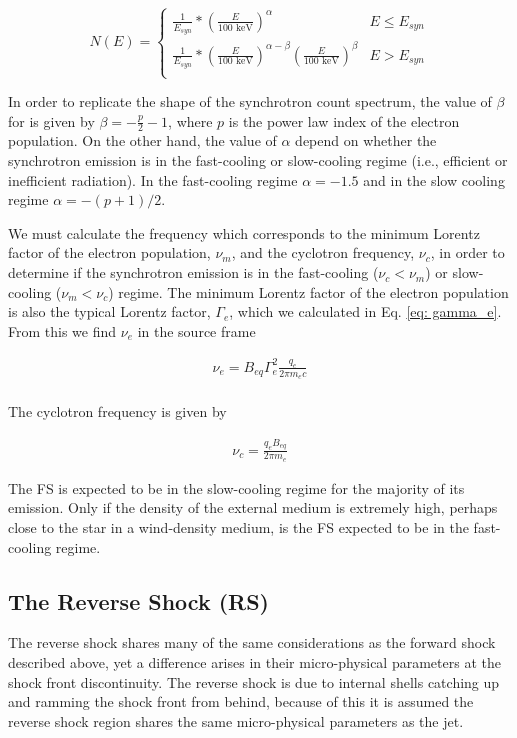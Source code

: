 \documentclass[linenumbers,twocolumn]{aastex631}
\begin{document}
\[ N(E) =
	\begin{cases}
		\frac{1}{E_{syn}}*\left(\frac{E}{100 \text{ keV}}\right)^\alpha & E\leq E_{syn} \\
		\frac{1}{E_{syn}}*\left(\frac{E}{100 \text{ keV}}\right)^{\alpha-\beta}\left(\frac{E}{100\text{ keV}}\right)^\beta & E > E_{syn} \\
	\end{cases}
\]

In order to replicate the shape of the synchrotron count spectrum, the value of $\beta$ for is given by $\beta = -\frac{p}{2} - 1$, where $p$ is the power law index of the electron population. On the other hand, the value of $\alpha$ depend on whether the synchrotron emission is in the fast-cooling or slow-cooling regime (i.e., efficient or inefficient radiation). In the fast-cooling regime $\alpha=-1.5$ and in the slow cooling regime $\alpha=-(p+1)/2$.

We must calculate the frequency which corresponds to the minimum Lorentz factor of the electron population, $\nu_m$, and the cyclotron frequency, $\nu_c$, in order to determine if the synchrotron emission is in the fast-cooling ($\nu_c < \nu_m$) or slow-cooling ($\nu_m < \nu_c$) regime. The minimum Lorentz factor of the electron population is also the typical Lorentz factor, $\Gamma_e$, which we calculated in Eq. \ref{eq: gamma_e}. From this we find $\nu_e$ in the source frame 

\begin{align}
	\nu_e = B_{eq} \Gamma_{e}^2 \frac{q_e}{2\pi m_e c}\\ 
\end{align}

The cyclotron frequency is given by

\begin{align}
	\nu_c = \frac{q_e B_{eq}}{2 \pi m_e}
\end{align}

The FS is expected to be in the slow-cooling regime for the majority of its emission. Only if the density of the external medium is extremely high, perhaps close to the star in a wind-density medium, is the FS expected to be in the fast-cooling regime.

\subsection{The Reverse Shock (RS)}

The reverse shock shares many of the same considerations as the forward shock described above, yet a difference arises in their micro-physical parameters at the shock front discontinuity. The reverse shock is due to internal shells catching up and ramming the shock front from behind, because of this it is assumed the reverse shock region shares the same micro-physical parameters as the jet.
\end{document}
